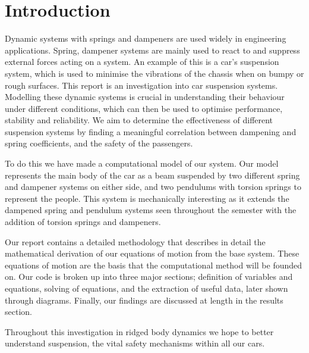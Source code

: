 \section{Introduction}

Dynamic systems with springs and dampeners are used widely in engineering applications. Spring, dampener systems are mainly used to react to and suppress external forces acting on a system. An example of this is a car's suspension system, which is used to minimise the vibrations of the chassis when on bumpy or rough surfaces. This report is an investigation into car suspension systems. Modelling these dynamic systems is crucial in understanding their behaviour under different conditions, which can then be used to optimise performance, stability and reliability. We aim to determine the effectiveness of different suspension systems by finding a meaningful correlation between dampening and spring coefficients, and the safety of the passengers.

To do this we have made a computational model of our system. Our model represents the main body of the car as a beam suspended by two different spring and dampener systems on either side, and two pendulums with torsion springs to represent the people. This system is mechanically interesting as it extends the dampened spring and pendulum systems seen throughout the semester with the addition of torsion springs and dampeners.

Our report contains a detailed methodology that describes in detail the mathematical derivation of our equations of motion from the base system. These equations of motion are the basis that the computational method will be founded on. Our code is broken up into three major sections; definition of variables and equations, solving of equations, and the extraction of useful data, later shown through diagrams. Finally, our findings are discussed at length in the results section.

Throughout this investigation in ridged body dynamics we hope to better understand suspension, the vital safety mechanisms within all our cars.
